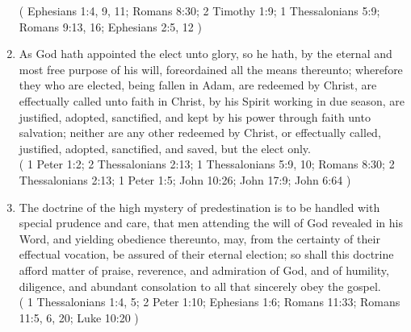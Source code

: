 \documentclass[12pt,a4paper]{book}
\begin{document}
\begin{enumerate}
( Ephesians 1:4, 9, 11; Romans 8:30; 2 Timothy 1:9; 1 Thessalonians 5:9; Romans 9:13, 16; Ephesians 2:5, 12 )
\item
\label{ch-dec-6}
As God hath appointed the elect unto glory, so he hath, by the eternal and most free purpose of his will, foreordained all the means thereunto; wherefore they who are elected, being fallen in Adam, are redeemed by Christ, are effectually called unto faith in Christ, by his Spirit working in due season, are justified, adopted, sanctified, and kept by his power through faith unto salvation; neither are any other redeemed by Christ, or effectually called, justified, adopted, sanctified, and saved, but the elect only.\\
( 1 Peter 1:2; 2 Thessalonians 2:13; 1 Thessalonians 5:9, 10; Romans 8:30; 2 Thessalonians 2:13; 1 Peter 1:5; John 10:26; John 17:9; John 6:64 )
\item
\label{ch-dec-7}
The doctrine of the high mystery of predestination is to be handled with special prudence and care, that men attending the will of God revealed in his Word, and yielding obedience thereunto, may, from the certainty of their effectual vocation, be assured of their eternal election; so shall this doctrine afford matter of praise, reverence, and admiration of God, and of humility, diligence, and abundant consolation to all that sincerely obey the gospel.\\
( 1 Thessalonians 1:4, 5; 2 Peter 1:10; Ephesians 1:6; Romans 11:33; Romans 11:5, 6, 20; Luke 10:20 )
\end{enumerate}
\end{document}
